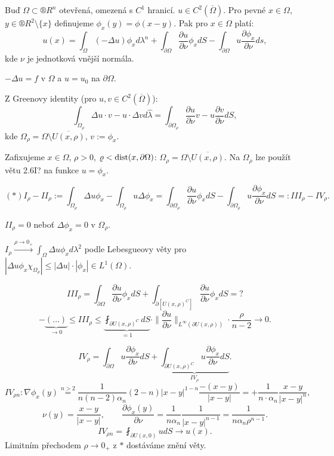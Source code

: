 \documentclass[12pt]{article}					%
\begin{document}
\begin{veta}[O 3 potenciálech]
	Buď $\Omega \subset ®R^n$ otevřená, omezená s $C^1$ hranicí. $u \in C^2(\overline{\Omega})$. Pro pevné $x \in \Omega$, $y \in ®R^2 \setminus\{x\}$ definujeme $\phi_x(y) = \phi(x - y)$. Pak pro $x \in \Omega$ platí:
	$$ u(x) = \int_\Omega (-\Delta u) \phi_x d\lambda^n + \int_{\partial \Omega} \frac{\partial u}{\partial \nu}\phi_x dS - \int_{\partial \Omega} u \frac{\partial \phi_x}{\partial \nu} ds, $$
	kde $\nu$ je jednotková vnější normála.

	\begin{poznamkain}
		$-\Delta u = f$ v $\Omega$ a $u = u_0$ na $\partial \Omega$.
	\end{poznamkain}

	\begin{dukazin}
		Z Greenovy identity (pro $u, v \in C^2(\overline{\Omega})$):
		$$ \int_{\Omega_\rho} \Delta u · v - u · \Delta v d\hat{\lambda} = \int_{\partial \Omega_\rho} \frac{\partial u}{\partial \nu} v - u \frac{\partial v}{\partial \nu} dS, $$
		kde $\Omega_\rho = \Omega \setminus \overline{U(x, \rho)}$, $v:= \phi_x$.

		Zafixujeme $x \in \Omega$, $\rho > 0$, $\varrho < \operatorname{dist}(x, \partial \Omega)$: $\Omega_\rho = \Omega \setminus \overline{U(x, \rho)}$. Na $\Omega_\rho$ lze použít větu 2.6I? na funkce $u = \phi_x$.

		$$ (*) I_\rho - II_\rho := \int_{\Omega_\rho} \Delta u \phi_x - \int_{\Omega_\rho} u \Delta \phi_x = \int_{\partial \Omega_\rho} \frac{\partial u}{\partial \nu} \phi_x dS - \int_{\partial \Omega_\rho} u \frac{\partial \phi_x}{\partial \nu} dS =: III_\rho - IV_\rho. $$

		$II_\rho = 0$ neboť $\Delta \phi_x = 0$ v $\Omega_\rho$.

		$I_\rho \overset{\rho \rightarrow 0_+}\longrightarrow \int_\Omega \Delta u \phi_x d\lambda^2$ podle Lebesgueovy věty pro $|\Delta u \phi_x \chi_{\Omega_\rho}| ≤ |\Delta u|·|\phi_x| \in L^1(\Omega)$.

		$$ III_\rho = \int_{\partial \Omega} \frac{\partial u}{\partial \nu} \phi_x dS + \int_{\partial[U(x, \rho)^C]} \frac{\partial u}{\partial \nu} \phi_x dS = ? $$
		$$ -\underbrace{(…)}_{\rightarrow 0} ≤ III_\rho ≤ \underbrace{\fint_{\partial U(x, \rho)^C} dS}_{=1} · \|\frac{\partial u}{\partial \nu}\|_{L^∞(\partial U(x, \rho))}·\frac{\rho}{n-2} \rightarrow 0. $$

		$$ IV_\rho = \int_{\partial \Omega} u \frac{\partial \phi_x}{\partial \nu} dS + \underbrace{\int_{\partial U(x, \rho)^C} u \frac{\partial \phi_x}{\partial \nu} dS}_{IV_\rho}. $$
		$$ IV_{\rho n}: \nabla \phi_x(y) \overset{n > 2} = \frac{1}{n(n-2)\alpha_n} (2 - n) |x - y|^{1 - n} \frac{-(x - y)}{|x - y|} = + \frac{1}{n·\alpha_n} \frac{x - y}{|x - y|^n}, $$
		$$ \nu(y) = \frac{x - y}{|x - y|}, \qquad \frac{\partial \phi_x(y)}{\partial \nu} = \frac{1}{n \alpha_n} \frac{1}{|x - y|^{n-1}} = \frac{1}{n \alpha_n \rho^{n-1}}. $$
		$$ IV_{\rho n} = \fint_{\partial U(x, 0)} u dS \rightarrow u(x). $$
		Limitním přechodem $\rho \rightarrow 0_+$ z $*$ dostáváme znění věty.
	\end{dukazin}

\end{veta}
\end{document}
